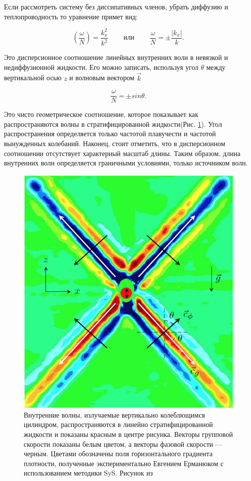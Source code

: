 Если рассмотреть систему без диссипативных членов, убрать диффузию и теплопроводность то уравнение примет вид:

\begin{equation}
    \left(\frac{\omega}{N}\right)=\frac{k^2_x}{k^2} \;\;\;\;\;\;\;\; или \;\;\;\;\;\;\;\; \frac{\omega}{N}=\pm \frac{|k_x|}{k}.
\end{equation}

Это дисперсионное соотношение линейных внутренних волн в невязкой и недиффузионной жидкости. Его можно записать, используя угол $\theta$ между вертикальной осью $z$ и волновым вектором $\vec{k}$

\begin{equation}
    \frac{\omega}{N} = \pm sin \theta.
    \label{eq:dispersion}
\end{equation}

Это чисто геометрическое соотношение, которое показывает как распространяются волны в стратифицированной жидкости(Рис. \ref{fig:ermExp}). Угол распространения определяется только частотой плавучести и частотой вынужденных колебаний. Наконец, стоит отметить, что в дисперсионном соотношении отсутствует характерный масштаб длины. Таким образом, длина внутренних волн определяется граничными условиями, только источником волн.

\begin{figure}
    \centering
    \includegraphics[scale=0.5]{Figs/Experement_Erm.png}
    \caption{Внутренние волны, излучаемые вертикально колеблющимся цилиндром, распространяются в линейно стратифицированной жидкости и  показаны красным в центре рисунка. Векторы групповой скорости показаны белым цветом, а векторы фазовой скорости — черным. Цветами обозначены поля горизонтального градиента плотности, полученные экспериментально Евгением Ерманюком с использованием методики SyS. Рисунок из \cite{brouzet:tel-01361201}}
    \label{fig:ermExp}
\end{figure}

